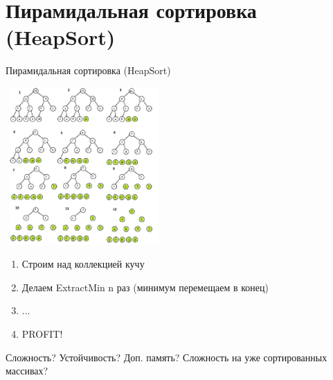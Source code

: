 \documentclass[10pt]{beamer}
\begin{document}
\section{Пирамидальная сортировка (HeapSort)}
\begin{frame}[fragile]{Пирамидальная сортировка (HeapSort)}
\begin{multicols}{2}
\includegraphics[width=6cm, height=6cm]{Term_1/Source/Pirctures/heapsort.png}\\
\vfill\eject
\begin{enumerate}
    \item Строим над коллекцией кучу
    \item Делаем ExtractMin n раз (минимум перемещаем в конец)
    \item ...
    \item PROFIT!
\end{enumerate}
Сложность? Устойчивость? Доп. память? Сложность на уже сортированных массивах? 
\end{multicols}
\end{frame}
\end{document}
